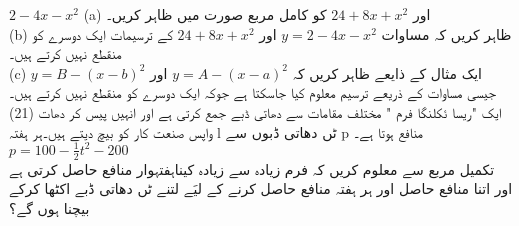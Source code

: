 $ 2-4x-x^2 $ (a)
اور
$  24+8x+x^2 $
کو کامل مربع صورت میں ظاہر کریں۔\\(b)
ظاہر کریں کہ مساوات 
$ y=2-4x-x^2 $
اور
$ 24+8x+x^2 $
کے ترسیمات ایک دوسرے کو منقطع نہیں کرتے ہیں۔ \\ (c)
ایک مثال کے ذایعے ظاہر کریں کہ 
$y=A-(x-a)^2$
اور
$y=B-(x-b)^2$
جیسی مساوات کے ذریعے ترسیم معلوم کیا جاسکتا ہے جوکہ ایک دوسرے کو منقطع نہیں کرتے ہیں۔\\(21)
ایک "ریسا ئکلنگا فرم " مختلف مقامات سے دھاتی ڈبے جمع کرتی ہے اور انہیں پیس کر دھات واپس صنعت کار کو بیچ دیتے ہیں۔ہر ہفتہ l ٹں دھاتی ڈبوں سے p منافع ہوتا ہے۔
\(p=100-\frac{1}{2}t^{2}-200\)\\
تکمیل مربع سے معلوم کریں کہ فرم زیادہ سے زیادہ کیناہفتہوار منافع حاصل کرتی ہے اور اتنا منافع حاصل اور ہر ہفتہ منافع حاصل کرنے کے لیَے لتنے ٹں دھاتی ڈبے اکٹھا کرکے بیچنا ہوں گے؟
  

